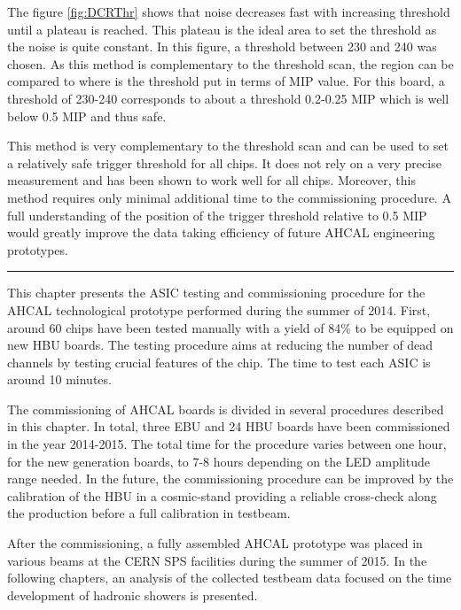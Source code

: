 The figure \ref{fig:DCRThr} shows that noise decreases fast with increasing threshold until a plateau is reached. This plateau is the ideal area to set the threshold as the noise is quite constant. In this figure, a threshold between 230 and 240 was chosen. As this method is complementary to the threshold scan, the region can be compared to where is the threshold put in terms of MIP value. For this board, a threshold of 230-240 corresponds to about a threshold 0.2-0.25 MIP which is well below 0.5 MIP and thus safe.

This method is very complementary to the threshold scan and can be used to set a relatively safe trigger threshold for all chips. It does not rely on a very precise measurement and has been shown to work well for all chips. Moreover, this method requires only minimal additional time to the commissioning procedure. A full understanding of the position of the trigger threshold relative to 0.5 MIP would greatly improve the data taking efficiency of future AHCAL engineering prototypes.

\begin{center}
  \rule{0.5\textwidth}{.4pt}
\end{center}

This chapter presents the ASIC testing and commissioning procedure for the AHCAL technological prototype performed during the summer of 2014. First, around 60 chips have been tested manually with a yield of 84\% to be equipped on new HBU boards. The testing procedure aims at reducing the number of dead channels by testing crucial features of the chip. The time to test each ASIC is around 10 minutes.

The commissioning of AHCAL boards is divided in several procedures described in this chapter. In total, three EBU and 24 HBU boards have been commissioned in the year 2014-2015. The total time for the procedure varies between one hour, for the new generation boards, to 7-8 hours depending on the LED amplitude range needed. In the future, the commissioning procedure can be improved by the calibration of the HBU in a cosmic-stand providing a reliable cross-check along the production before a full calibration in testbeam.

After the commissioning, a fully assembled AHCAL prototype was placed in various beams at the CERN SPS facilities during the summer of 2015. In the following chapters, an analysis of the collected testbeam data focused on the time development of hadronic showers is presented.
